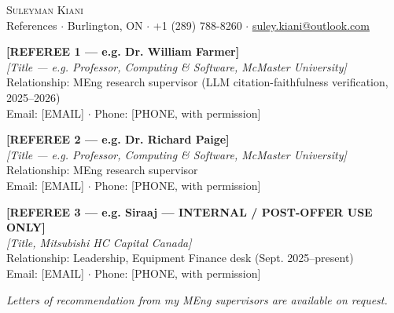 \documentclass[letterpaper,11pt]{article}
\begin{document}
\begin{center}
    {\Huge \scshape Suleyman Kiani} \\ \vspace{3pt}
    \small References $\cdot$ Burlington, ON $\cdot$ +1 (289) 788-8260 $\cdot$ \href{mailto:suley.kiani@outlook.com}{\underline{suley.kiani@outlook.com}}
\end{center}

\vspace{14pt}

\textbf{[REFEREE 1 — e.g. Dr. William Farmer]} \\
\textit{[Title — e.g. Professor, Computing \& Software, McMaster University]} \\
Relationship: MEng research supervisor (LLM citation-faithfulness verification, 2025--2026) \\
Email: [EMAIL] $\cdot$ Phone: [PHONE, with permission]

\vspace{10pt}

\textbf{[REFEREE 2 — e.g. Dr. Richard Paige]} \\
\textit{[Title — e.g. Professor, Computing \& Software, McMaster University]} \\
Relationship: MEng research supervisor \\
Email: [EMAIL] $\cdot$ Phone: [PHONE, with permission]

\vspace{10pt}

\textbf{[REFEREE 3 — e.g. Siraaj — INTERNAL / POST-OFFER USE ONLY]} \\
\textit{[Title, Mitsubishi HC Capital Canada]} \\
Relationship: Leadership, Equipment Finance desk (Sept. 2025--present) \\
Email: [EMAIL] $\cdot$ Phone: [PHONE, with permission]

\vspace{14pt}

\small\textit{Letters of recommendation from my MEng supervisors are available on request.}
\end{document}
